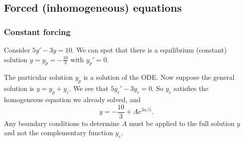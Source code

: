 \documentclass[a4paper]{article}
\begin{document}
\subsection{Forced (inhomogeneous) equations}
\subsubsection{Constant forcing}
\begin{eg}
  Consider $5y' - 3y = 10$. We can spot that there is a equilibrium (constant) solution $y = y_p = -\frac{10}{3}$ with $y_p' = 0$.
  
  The particular solution $y_p$ is a solution of the ODE. Now suppose the general solution is $y = y_p + y_c$. We see that $5y_c' - 3y_c = 0$. So $y_c$ satisfies the homogeneous equation we already solved, and
  \[
  y = -\frac{10}{3} + Ae^{3x/5}.
  \]
  \note Any boundary conditions to determine $A$ must be applied to the full solution $y$ and not the complementary function $y_c$. 
\end{eg}
\end{document}
